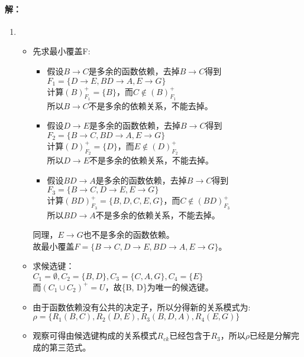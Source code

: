 \paragraph{解：}
\begin{enumerate}
	\item 
	\begin{itemize}
		\item 先求最小覆盖F: \\
		\begin{itemize}
			\item 假设$B \to C$是多余的函数依赖，去掉$B \to C$得到$F_{1}=\{D \to E, BD \to A, E \to G\}$\\
			计算$(B)^{+}_{F_{1}}=\{B\}$，而$C \notin (B)^{+}_{F_{1}}$ \\
			所以$B \to C$不是多余的依赖关系，不能去掉。
			
			\item 假设$D \to E$是多余的函数依赖，去掉$B \to C$得到$F_{2}=\{B \to C, BD \to A, E \to G\}$\\
			计算$(D)^{+}_{F_{2}}=\{D\}$，而$E \notin (D)^{+}_{F_{2}}$ \\
			所以$D \to E$不是多余的依赖关系，不能去掉。
			
			\item 假设$BD \to A$是多余的函数依赖，去掉$B \to C$得到$F_{3}=\{B \to C, D \to E, E \to G\}$\\
			计算$(BD)^{+}_{F_{3}}=\{B, D, C, E, G\}$，而$C \notin (BD)^{+}_{F_{3}}$ \\
			所以$BD \to A$不是多余的依赖关系，不能去掉。	
		\end{itemize}
		同理，$E \to G$也不是多余的函数依赖。\\
		故最小覆盖$F=\{B \to C, D \to E, BD \to A, E \to G\}$。
		
		\item 求候选键：\\
		$C_{1}=\emptyset, C_{2}=\{B, D\}, C_{3}=\{C, A, G\}, C_{4}=\{E\}$ \\
		而$(C_{1} \cup C_{2})^{+}=U$，故\{B, D\}为唯一的候选键。
		
		\item 由于函数依赖没有公共的决定子，所以分得新的关系模式为:\\
		$\rho=\{R_{1}(B, C), R_{2}(D, E), R_{3}(B, D, A), R_{4}(E, G)\}$
		
		\item 观察可得由候选键构成的关系模式$R_{ck}$已经包含于$R_{3}$，所以$\rho$已经是分解完成的第三范式。
	\end{itemize}


\end{enumerate}
